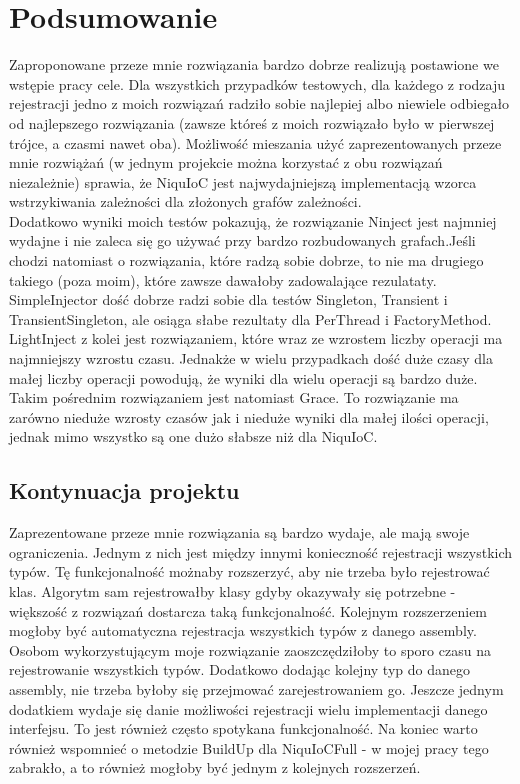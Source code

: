 \documentclass[12pt]{article}
\begin{document}
\section{Podsumowanie}
Zaproponowane przeze mnie rozwiązania bardzo dobrze realizują postawione we wstępie pracy cele. Dla wszystkich przypadków testowych, dla każdego z rodzaju rejestracji jedno z moich rozwiązań radziło sobie najlepiej albo niewiele odbiegało od najlepszego rozwiązania (zawsze któreś z moich rozwiązało było w pierwszej trójce, a czasmi nawet oba). Możliwość mieszania użyć zaprezentowanych przeze mnie rozwiążań (w jednym projekcie można korzystać z obu rozwiązań niezależnie) sprawia, że NiquIoC jest najwydajniejszą implementacją wzorca wstrzykiwania zależności dla złożonych grafów zależności.\\
Dodatkowo wyniki moich testów pokazują, że rozwiązanie Ninject jest najmniej wydajne i nie zaleca się go używać przy bardzo rozbudowanych grafach.Jeśli chodzi natomiast o rozwiązania, które radzą sobie dobrze, to nie ma drugiego takiego (poza moim), które zawsze dawałoby zadowalające rezulataty. SimpleInjector dość dobrze radzi sobie dla testów Singleton, Transient i TransientSingleton, ale osiąga słabe rezultaty dla PerThread i FactoryMethod. LightInject z kolei jest rozwiązaniem, które wraz ze wzrostem liczby operacji ma najmniejszy wzrostu czasu. Jednakże w wielu przypadkach dość duże czasy dla małej liczby operacji powodują, że wyniki dla wielu operacji są bardzo duże. Takim pośrednim rozwiązaniem jest natomiast Grace. To rozwiązanie ma zarówno nieduże wzrosty czasów jak i nieduże wyniki dla małej ilości operacji, jednak mimo wszystko są one dużo słabsze niż dla NiquIoC.

\subsection{Kontynuacja projektu}
Zaprezentowane przeze mnie rozwiązania są bardzo wydaje, ale mają swoje ograniczenia. Jednym z nich jest między innymi konieczność rejestracji wszystkich typów. Tę funkcjonalność możnaby rozszerzyć, aby nie trzeba było rejestrować klas. Algorytm sam rejestrowałby klasy gdyby okazywały się potrzebne - większość z rozwiązań dostarcza taką funkcjonalność. Kolejnym rozszerzeniem mogłoby być automatyczna rejestracja wszystkich typów z danego assembly. Osobom wykorzystującym moje rozwiązanie zaoszczędziłoby to sporo czasu na rejestrowanie wszystkich typów. Dodatkowo dodając kolejny typ do danego assembly, nie trzeba byłoby się przejmować zarejestrowaniem go. Jeszcze jednym dodatkiem wydaje się danie możliwości rejestracji wielu implementacji danego interfejsu. To jest również często spotykana funkcjonalność. Na koniec warto również wspomnieć o metodzie BuildUp dla NiquIoCFull - w mojej pracy tego zabrakło, a to również mogłoby być jednym z kolejnych rozszerzeń. 
\end{document}
